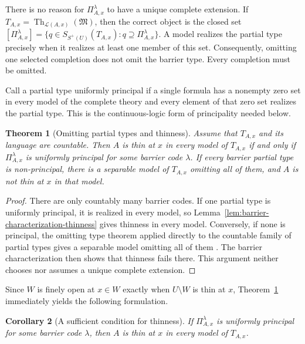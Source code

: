 \documentclass{amsart}
\newtheorem{theorem}{Theorem}[section]
\newtheorem{corollary}[theorem]{Corollary}
\theoremstyle{definition}
\theoremstyle{remark}
\numberwithin{equation}{section}
\begin{document}
There is no reason for $\Pi^\lambda_{A,x}$ to have a unique complete
extension. If $T_{A,x}=\operatorname{Th}_{\mathcal L(A,x)}(\mathfrak M)$,
then the correct object is the closed set
$[\Pi^\lambda_{A,x}]=\{q\in S_{S^+(U)}(T_{A,x}):q\supseteq
\Pi^\lambda_{A,x}\}$. A model realizes the partial type precisely when it
realizes at least one member of this set. Consequently, omitting one selected
completion does not omit the barrier type. Every completion must be omitted.

Call a partial type uniformly principal if a single formula has a nonempty
zero set in every model of the complete theory and every element of that zero
set realizes the partial type. This is the continuous-logic form of
principality needed below.

\begin{theorem}[Omitting partial types and thinness]
\label{thm:OTT-persistent-thinness}
Assume that $T_{A,x}$ and its language are countable. Then $A$ is thin at $x$
in every model of $T_{A,x}$ if and only if
$\Pi^\lambda_{A,x}$ is uniformly principal for some barrier code $\lambda$.
If every barrier partial type is non-principal, there is a separable model of
$T_{A,x}$ omitting all of them, and $A$ is not thin at $x$ in that model.
\end{theorem}

\begin{proof}
There are only countably many barrier codes. If one partial type is uniformly
principal, it is realized in every model, so
Lemma~\ref{lem:barrier-characterization-thinness} gives thinness in every
model. Conversely, if none is principal, the omitting type theorem applied
directly to the countable family of partial types gives a separable model
omitting all of them \cite[Theorem~4.9]{Eagle2014omiting}. The barrier
characterization then shows that thinness fails there. This argument neither
chooses nor assumes a unique complete extension.
\end{proof}

Since $W$ is finely open at $x\in W$ exactly when $U\setminus W$ is thin at
$x$, Theorem~\ref{thm:OTT-persistent-thinness} immediately yields the
following formulation.

\begin{corollary}[A sufficient condition for thinness]
\label{cor:OTT-fine-openness}
If $\Pi^\lambda_{A,x}$ is uniformly principal for some barrier code $\lambda$, then $A$ is thin at $x$ in every model of $T_{A,x}$.
\end{corollary}
\end{document}

